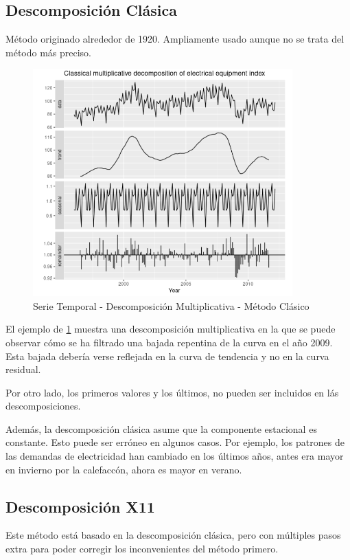 \documentclass{article}
\begin{document}
        \subsection{Descomposición Clásica}
        Método originado alrededor de 1920. Ampliamente usado aunque no se trata del método más preciso.\newline
	\begin{figure}[h]
		\centering
                \label{fig_3}
                \includegraphics[width=10cm]{Ejemplo_descomposicion_clasico}
		\caption{Serie Temporal - Descomposición Multiplicativa - Método Clásico}
	\end{figure} 
        
        El ejemplo de \ref{fig_3} muestra una descomposición multiplicativa en la que se puede observar cómo se ha filtrado una bajada repentina de la curva en el año 2009. Esta bajada debería verse reflejada en la curva de tendencia y no en la curva residual.
        
        Por otro lado, los primeros valores y los últimos, no pueden ser incluidos en lás descomposiciones.

        Además, la descomposición clásica asume que la componente estacional es constante. Esto puede ser erróneo en algunos casos. Por ejemplo, los patrones de las demandas de electricidad han cambiado en los últimos años, antes era mayor en invierno por la calefaccón, ahora es mayor en verano.

        \subsection{Descomposición X11}
        Este método está basado en la descomposición clásica, pero con múltiples pasos extra para poder corregir los inconvenientes del método primero. 
        
\end{document}
